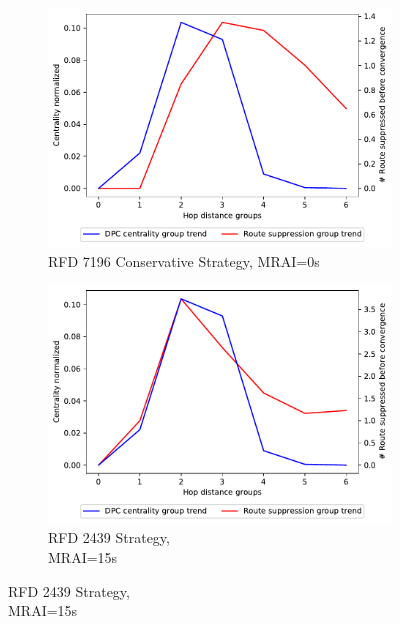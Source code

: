 \begin{figure}[H]
\begin{subfigure}[b]{0.325\textwidth}
     \end{subfigure}
     \hfill
     \begin{subfigure}[b]{0.325\textwidth}
         \centering
         \includegraphics[width=\textwidth]{images/RFD/miceVSelephants/MultiMRAI/0/mice/cisco_1000_RFD_7196_conservative_nodeConvergence_centVSsup_trend.pdf}
         \caption{RFD 7196 Conservative Strategy, MRAI=0s}
         \label{fig:1000_7196RFDC_centVSsup_mices}
     \end{subfigure}
     \vfill
     \begin{subfigure}[b]{0.325\textwidth}
         \centering
         \includegraphics[width=\textwidth]{images/RFD/miceVSelephants/MultiMRAI/15/mice/cisco_1000_RFD_nodeConvergence_centVSsup_trend.pdf}
         \caption{RFD 2439 Strategy, \\MRAI=15s}
         \label{fig:1000_2439RFD_centVSsup_mices}

\end{subfigure}
\end{figure}
